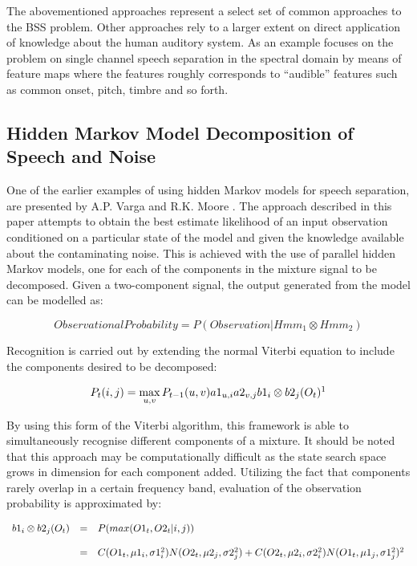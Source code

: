 \documentclass[11pt, oneside, a4paper]{report}
\begin{document}
The abovementioned approaches represent a select set of common
approaches to the  BSS problem. Other approaches rely to a larger
extent on direct application of knowledge about the human auditory
system. As an example \cite{bach} focuses on the problem on single channel speech
separation in the spectral domain by means of feature
maps where the features roughly corresponds to ``audible'' features such
as common onset, pitch, timbre and so forth. 


\subsection{Hidden Markov Model Decomposition of Speech and Noise}
One of the earlier examples of using hidden Markov models for speech separation,
 are presented by A.P. Varga and R.K. Moore \cite{VargaHMMDecomp}. 
The approach described in this paper attempts to obtain the best estimate 
likelihood of an input observation conditioned on a particular state of the 
model and given the knowledge available about the contaminating noise. This 
is achieved with the use of parallel hidden Markov models, one for each of 
the components in the mixture signal to be decomposed. Given a two-component 
signal, the output generated from the model can be modelled as:

\begin{equation}\label{vargasEqn1}
Observational Probability = P(Observation|Hmm_1 \otimes Hmm_2)
\end{equation}

Recognition is carried out by extending the normal Viterbi equation to include 
the components desired to be decomposed:


\begin{equation}\label{vargasEqn2}
P_t(i,j) = \max_{u,v} P_{t-1} (u, v) a1_{u,i} a2_{v,j} b1_i \otimes b2_j (O_t)  \footnotemark
\end{equation}


By using this form of the Viterbi algorithm, this framework is able to simultaneously 
recognise different components of a mixture. It should be noted that this approach may 
be computationally difficult as the state search space grows in dimension for each component added.
Utilizing the fact that components rarely overlap in a certain frequency band, evaluation 
of the observation probability is approximated by:

\begin{equation}\label{vargasEqn3}
\begin{array}{lcl}
b1_i \otimes b2_j(O_t) &=&  P(max(O1_t, O2_t|i,j)) \\
\\ &  = &  C(O1_t,\mu1_i,\sigma1^2_i)N(O2_t, \mu2_j,\sigma2^2_j) + C(O2_t,\mu2_i,\sigma2^2_i)N(O1_t, \mu1_j,\sigma1^2_j)\footnotemark\\
\end{array}
\end{equation}
\end{document}
